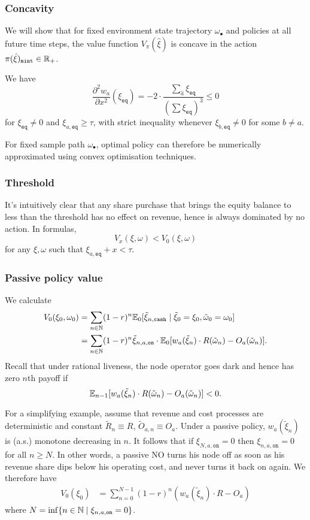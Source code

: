 \subsubsection{Concavity}
We will show that for fixed environment state trajectory $\omega_\bullet$ and policies at all future time steps, the value function $V_\pi(\hat\xi)$ is concave in the action $\pi(\hat\xi)_\mathtt{mint}\in\mathbb{R}_+$.

We have
\[
  \frac {\partial^2 w_a} {\partial x^2} (\xi_\mathtt{eq}) = -2\cdot\frac {\sum_{\hat a}\xi_\mathtt{eq}} {(\sum \xi_\mathtt{eq})^3} \leq 0
\]
for $\xi_\mathtt{eq}\neq 0$ and $\xi_{a,\mathtt{eq}}\geq\tau$, with strict inequality whenever $\xi_{b,\mathtt{eq}}\neq 0$ for some $b\neq a$.

For fixed sample path $\omega_\bullet$, optimal policy can therefore be numerically approximated using convex optimisation techniques.

\subsubsection{Threshold}
%
It's intuitively clear that any share purchase that brings the equity balance to less than the threshold has no effect on revenue, hence is always dominated by no action.
%
In formulas,
\[
  V_x(\xi,\omega) < V_0(\xi,\omega) 
\]
for any $\xi,\omega$ such that $\xi_{a,\mathtt{eq}}+x <\tau$.

\subsubsection{Passive policy value}

We calculate
\begin{align*}
  V_0(\xi_0,\omega_0) &= \sum_{n\in\mathbb{N}}(1-r)^n \mathbb{E}_0[\tilde\xi_{n,\mathtt{cash}} \mid \tilde\xi_0=\xi_0, \tilde\omega_0=\omega_0 ] \\
  &= \sum_{n\in\mathbb{N}}(1-r)^n \tilde\xi_{n,a,\mathtt{on}} \cdot \mathbb{E}_0[ w_a(\tilde\xi_n)\cdot R(\tilde\omega_n) - O_a(\tilde\omega_n) ].
\end{align*}
Recall that under rational liveness, the node operator goes dark and hence has zero $n$th payoff if 
\[
  \mathbb{E}_{n-1}[w_a(\tilde\xi_n)\cdot R(\tilde\omega_n) - O_a(\tilde\omega_n) ] < 0.
\]

For a simplifying example, assume that revenue and cost processes are deterministic and constant $\tilde{R}_n\equiv R$, $\tilde{O}_{a,n}\equiv O_a$.
%
Under a passive policy, $w_a(\tilde \xi_n)$ is (a.s.) monotone decreasing in $n$.
%
It follows that if $\xi_{N,a,\mathtt{on}}=0$ then $\xi_{n,a,\mathtt{on}}=0$ for all $n\geq N$.
%
In other words, a passive NO turns his node off as soon as his revenue share dips below his operating cost, and never turns it back on again.
%
We therefore have
\begin{align*}
  V_0(\xi_0) &= \sum_{n=0}^{N-1}(1-r)^n (w_a(\tilde\xi_n)\cdot R - O_a)
\end{align*}
where $N=\inf\{n\in\mathbb{N}\mid \xi_{n,a,\mathtt{on}}=0\}$.

